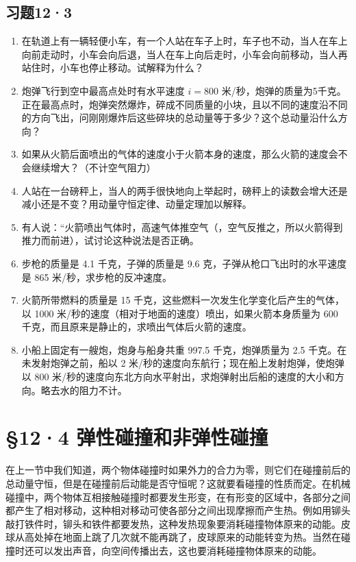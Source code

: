\subsection{习题12·3}\label{ux4e60ux9898123}

\begin{enumerate}
\def\labelenumi{\arabic{enumi}.}
\item
  在轨道上有一辆轻便小车，有一个人站在车子上时，车子也不动，当人在车上向前走动时，小车会向后退，当人在车上向后走时，小车会向前移动，当人再站住时，小车也停止移动。试解释为什么？
\item
  炮弹飞行到空中最高点处时有水平速度 \(i = 800\)
  米/秒，炮弹的质量为5千克。正在最高点时，炮弹突然爆炸，碎成不同质量的小块，且以不同的速度沿不同的方向飞出，问刚刚爆炸后这些碎块的总动量等于多少？这个总动量沿什么方向？
\item
  如果从火箭后面喷出的气体的速度小于火箭本身的速度，那么火箭的速度会不会继续增大？（不计空气阻力）
\item
  人站在一台磅秤上，当人的两手很快地向上举起时，磅秤上的读数会增大还是减小还是不变？用动量守恒定律、动量定理加以解释。
\item
  有人说：``火箭喷出气体时，高速气体推空气（，空气反推之，所以火箭得到推力而前进），试讨论这种说法是否正确。
\item
  步枪的质量是 4.1 千克，子弹的质量是 9.6
  克，子弹从枪口飞出时的水平速度是 865 米/秒，求步枪的反冲速度。
\item
  火箭所带燃料的质量是 15 千克，这些燃料一次发生化学变化后产生的气体，以
  1000 米/秒的速度（相对于地面的速度）喷出，如果火箭本身质量为 600
  千克，而且原来是静止的，求喷出气体后火箭的速度。
\item
  小船上固定有一艘炮，炮身与船身共重 997.5 千克，炮弹质量为 2.5
  千克。在未发射炮弹之前，船以 2
  米/秒的速度向东航行；现在船上发射炮弹，使炮弹以 800
  米/秒的速度向东北方向水平射出，求炮弹射出后船的速度的大小和方向。略去水的阻力不计。
\end{enumerate}

\section{§12·4
弹性碰撞和非弹性碰撞}\label{ux5f39ux6027ux78b0ux649eux548cux975eux5f39ux6027ux78b0ux649e}

在上一节中我们知道，两个物体碰撞时如果外力的合力为零，则它们在碰撞前后的总动量守恒，但是在碰撞前后动能是否守恒呢？这就要看碰撞的性质而定。在机械碰撞中，两个物体互相接触碰撞时都要发生形变，在有形变的区域中，各部分之间都产生了相对移动，这种相对移动可使各部分之间出现摩擦而产生热。例如用铆头敲打铁件时，铆头和铁件都要发热，这种发热现象要消耗碰撞物体原来的动能。皮球从高处掉在地面上跳了几次就不能再跳了，皮球原来的动能转变为热。当然在碰撞时还可以发出声音，向空间传播出去，这也要消耗碰撞物体原来的动能。

